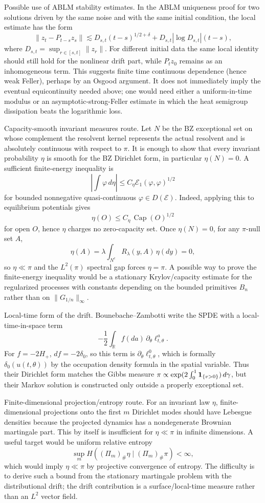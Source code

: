 \documentclass[12pt]{article}
\begin{document}
Possible use of ABLM stability estimates.  In the ABLM uniqueness proof
for two solutions driven by the same noise and with the same initial
condition, the local estimate has the form
\[
\|z_t-P_{t-s}z_s\|\lesssim
D_{s,t}(t-s)^{1/2+\delta}+D_{s,t}|\log D_{s,t}|(t-s),
\]
where $D_{s,t}=\sup_{r\in[s,t]}\|z_r\|$.  For different initial data the
same local identity should still hold for the nonlinear drift part,
while $P_tz_0$ remains as an inhomogeneous term.  This suggests finite
time continuous dependence (hence weak Feller), perhaps by an Osgood
argument.  It does not immediately imply the eventual equicontinuity
needed above; one would need either a uniform-in-time modulus or an
asymptotic-strong-Feller estimate in which the heat semigroup
dissipation beats the logarithmic loss.

Capacity-smooth invariant measures route.  Let $N$ be the BZ exceptional
set on whose complement the resolvent kernel represents the actual
resolvent and is absolutely continuous with respect to $\pi$.  It is
enough to show that every invariant probability $\eta$ is smooth for the
BZ Dirichlet form, in particular $\eta(N)=0$.  A sufficient finite-energy
inequality is
\[
  \left|\int \varphi\,d\eta\right|
  \le C_\eta \mathcal E_1(\varphi,\varphi)^{1/2}
\]
for bounded nonnegative quasi-continuous $\varphi\in D(\mathcal E)$.
Indeed, applying this to equilibrium potentials gives
\[
  \eta(O)\le C_\eta\,\operatorname{Cap}(O)^{1/2}
\]
for open $O$, hence $\eta$ charges no zero-capacity set.  Once
$\eta(N)=0$, for any $\pi$-null set $A$,
\[
  \eta(A)=\lambda\int_{N^c}R_\lambda(y,A)\,\eta(dy)=0,
\]
so $\eta\ll\pi$ and the $L^2(\pi)$ spectral gap forces $\eta=\pi$.
A possible way to prove the finite-energy inequality would be a
stationary Krylov/capacity estimate for the regularized processes with
constants depending on the bounded primitives $B_n$ rather than on
$\|G_{1/n}\|_\infty$.

Local-time form of the drift.  Bounebache--Zambotti write the SPDE with
a local-time-in-space term
\[
 -\frac12\int_\mathbb R f(da)\,\partial_\theta \ell^a_{t,\theta}.
\]
For $f=-2H_+$, $df=-2\delta_0$, so this term is
$\partial_\theta\ell^0_{t,\theta}$, which is formally
$\delta_0(u(t,\theta))$ by the occupation density formula in the spatial
variable.  Thus their Dirichlet form matches the Gibbs measure
$\pi\propto\exp(2\int_0^1{\bf1}_{\{v>0\}})\,d\gamma$, but their Markov
solution is constructed only outside a properly exceptional set.

Finite-dimensional projection/entropy route.  For an invariant law
$\eta$, finite-dimensional projections onto the first $m$ Dirichlet
modes should have Lebesgue densities because the projected dynamics has
a nondegenerate Brownian martingale part.  This by itself is insufficient
for $\eta\ll\pi$ in infinite dimensions.  A useful target would be
uniform relative entropy
\[
  \sup_m H((\Pi_m)_\#\eta\mid(\Pi_m)_\#\pi)<\infty,
\]
which would imply $\eta\ll\pi$ by projective convergence of entropy.
The difficulty is to derive such a bound from the stationary martingale
problem with the distributional drift; the drift contribution is a
surface/local-time measure rather than an $L^2$ vector field.
\end{document}
